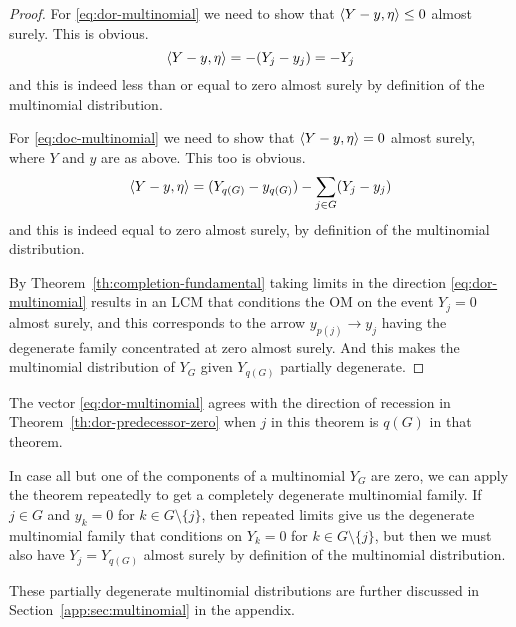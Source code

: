 \begin{proof}
For \eqref{eq:dor-multinomial} we need to show
that $\langle Y - y, \eta \rangle \le 0$ almost surely.
This is obvious.
$$
   \langle Y - y, \eta \rangle = - (Y_j - y_j)
   =
   - Y_j
$$
and this is indeed less than or equal to zero almost surely
by definition of the multinomial distribution.

For \eqref{eq:doc-multinomial} we need to show
that $\langle Y - y, \eta \rangle = 0$ almost surely,
where $Y$ and $y$ are as above.
This too is obvious.
$$
   \langle Y - y, \eta \rangle = (Y_{q(G)} - y_{q(G)}) - \sum_{j \in G} (Y_j - y_j)
$$
and this is indeed equal to zero almost surely,
by definition of the multinomial distribution.

By Theorem~\ref{th:completion-fundamental} taking limits in the direction
\eqref{eq:dor-multinomial} results in an LCM that conditions the OM on
the event $Y_j = 0$ almost surely, and this corresponds to
the arrow $y_{p(j)} \longrightarrow y_j$ having the degenerate family
concentrated at zero almost surely.  And this makes the multinomial
distribution of $Y_G$ given $Y_{q(G)}$ partially degenerate.
\end{proof}

The vector \eqref{eq:dor-multinomial} agrees
with the direction of recession in Theorem~\ref{th:dor-predecessor-zero}
when $j$ in this theorem is $q(G)$ in that theorem.

In case all but one of the components of a multinomial $Y_G$ are zero,
we can apply the theorem repeatedly to get a completely degenerate
multinomial family.  If $j \in G$ and $y_k = 0$ for $k \in G \setminus \{j\}$,
then repeated limits give us the degenerate multinomial family that
conditions on $Y_k = 0$ for $k \in G \setminus \{j\}$, but then we must
also have $Y_j = Y_{q(G)}$ almost surely by definition of the multinomial
distribution.

These partially degenerate multinomial distributions are further
discussed in Section~\ref{app:sec:multinomial} in the appendix.

